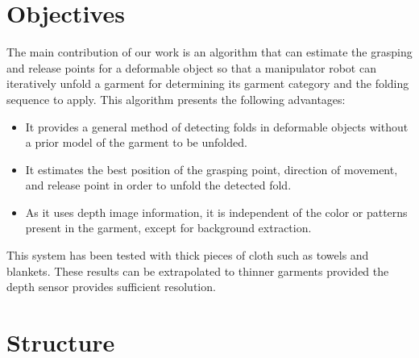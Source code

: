 \section{Objectives}
\label{intro_objectives}

The main contribution of our work is an algorithm that can estimate the grasping and release points for a deformable object so that a manipulator robot can iteratively unfold a garment for determining its garment category and the folding sequence to apply.
This algorithm presents the following advantages:

\begin{itemize}
	\item It provides a general method of detecting folds in deformable objects without a prior model of the garment to be unfolded.
	\item It estimates the best position of the grasping point, direction of movement, and release point in order to unfold the detected fold.
	\item As it uses depth image information, it is independent of the color or patterns present in the garment, except for background extraction.
\end{itemize}

This system has been tested with thick pieces of cloth such as towels and blankets. These results can be extrapolated to thinner garments provided the depth sensor provides sufficient resolution.

\section{Structure}
\label{intro_structure}